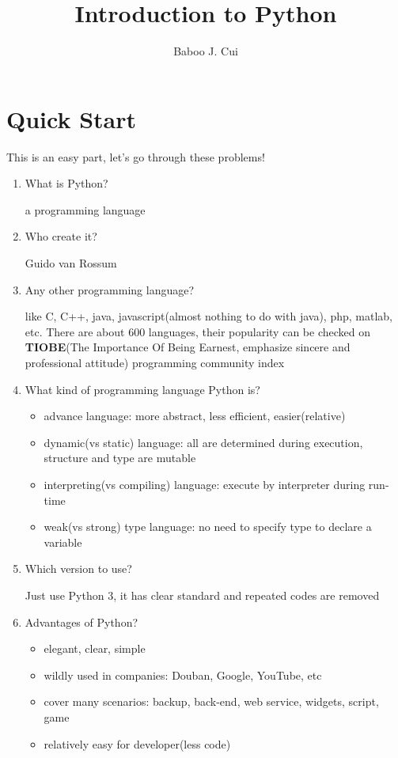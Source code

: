\documentclass[10pt,a4paper,oneside]{article}
\author{Baboo J. Cui}
\title{Introduction to Python}
\begin{document}
\maketitle
\tableofcontents

\newpage

\section{Quick Start}
This is an easy part, let's go through these problems!

\begin{enumerate}
	\item What is Python?
	
	a programming language
	
	\item Who create it?
	
	Guido van Rossum
	
	\item Any other programming language?
	
	like C, C++, java, javascript(almost nothing to do with java), php, matlab, etc. There are about $600$ languages, their popularity can be checked on \textbf{TIOBE}(The Importance Of Being Earnest, emphasize sincere and professional attitude) programming community index
	
	\item What kind of programming language Python is?
	\begin{itemize}
		\item advance language: more abstract,  less efficient, easier(relative)
		\item dynamic(vs static) language: all are determined during execution, structure and type are mutable
		\item interpreting(vs compiling) language: execute by interpreter during run-time 
		\item weak(vs strong) type language: no need to specify type to declare a variable
	\end{itemize}
	
	\item Which version to use?
	
	Just use Python 3, it has clear standard and repeated codes are removed
	
	\item Advantages of Python?
	\begin{itemize}
		\item elegant, clear, simple
		\item wildly used in companies: Douban, Google, YouTube, etc
		\item cover many scenarios: backup, back-end, web service, widgets, script, game
		\item relatively easy for developer(less code)
	\end{itemize}
	

\end{enumerate}
\end{document}
